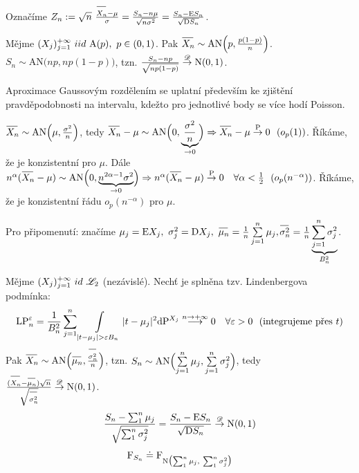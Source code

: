\begin{remark}
	Označíme $Z_n:=\sqrt{n}~\frac{\oxn -\mu}{\sigma}=\frac{S_n-n\mu}{\sqrt{n\sigma^2}}=\frac{S_n-\E  S_n}{\sqrt{\D  S_n}}$.
\end{remark}
\begin{theorem}
	Mějme $(X_j)_{j=1}^{+\infty}~iid~\mathrm{A}(p),~p\in(0,1)$. Pak $\oxn \sim \mathrm{AN}\Bigl( p,\frac{p(1-p)}{n} \Bigr)$. \newline
	$ S_n\sim \mathrm{AN}\bigl( np,np(1-p) \bigr) $, tzn. $\frac{S_n-np}{\sqrt{np(1-p)}}\stackrel{\mathscr{D}}{\to} \mathrm{N}(0,1)$.
\end{theorem}
\begin{remark}
	Aproximace Gaussovým rozdělením se uplatní především ke zjištění pravděpodobnosti na intervalu, kdežto pro jednotlivé body se více hodí Poisson.
\end{remark}
\begin{dusl}
	$\oxn \sim \mathrm{AN}\Bigl(\mu,\frac{\sigma^2}{n}\Bigr)$, tedy $\oxn -\mu \sim \mathrm{AN}\Bigl(0,\underbrace{\frac{\sigma^2}{n}}_{\to 0}\Bigr)\Rightarrow \oxn -\mu \Pto 0~~(o_p(1))$. Říkáme, že je konzistentní pro $\mu$. Dále\newline$n^\alpha(\oxn -\mu) \sim \mathrm{AN}\Bigl(0,\underbrace{n^{2\alpha-1}\sigma^2}_{\to 0}\Bigr)\Rightarrow n^\alpha(\oxn -\mu) \Pto 0~~~\forall \alpha<\frac{1}{2}~~(o_p(n^{-\alpha}))$. Říkáme, že je konzistentní řádu $o_p(n^{-\alpha})$ pro $\mu$.
\end{dusl}
\begin{remark}
	Pro připomenutí: značíme $\mu_j=\E X_j,~\sigma_j^2=\D X_j,~\omn=\frac{1}{n}\sum\limits_{j=1}^{n}\mu_j,$\newline$\osn=\frac{1}{n}\underbrace{\sum_{j=1}^{n}\sigma_j^2}_{B_n^2}$.
\end{remark}
\begin{theorem}
	Mějme $(X_j)_{j=1}^{+\infty}~id~\mathscr{L}_2$ (nezávislé). Nechť je splněna tzv. Lindenbergova podmínka:
	$$ \mathrm{LP}_n^\epsilon =\frac{1}{B_n^2}\sum\limits_{j=1}^{n}\int\limits_{|t-\mu_j|>\epsilon B_n}|t-\mu_j|^2\dif\PP^{X_j}\stackrel{n\to+\infty}{\longrightarrow}0~~~\forall\epsilon>0~~(\text{integrujeme přes}~t) $$
	Pak $\oxn\sim \mathrm{AN}\Br{\omn,\frac{\osn}{n}}$, tzn. $S_n\sim \mathrm{AN}\Bigl( \sum\limits_{j=1}^{n} \mu_j,\sum\limits_{j=1}^{n} \sigma_j^2\Bigr)$, tedy $\frac{(\oxn-\omn)\sqrt{n}}{\sqrt{\osn}}\Dto \mathrm{N}(0,1)$.
	$$ \frac{S_n-\sum_1^n\mu_j}{\sqrt{\sum_1^n \sigma_j^2}}=\frac{S_n-\mathrm{E} S_n}{\sqrt{\mathrm{D} S_n}}\stackrel{\mathscr{D}}{\to} \mathrm{N}(0,1) $$
	$$ \mathrm{F}_{S_n}\doteq \mathrm{F}_{\mathrm{N}\bigl( \sum_1^n \mu_j,~\sum_1^n \sigma_j^2\bigr) } $$
\end{theorem}
